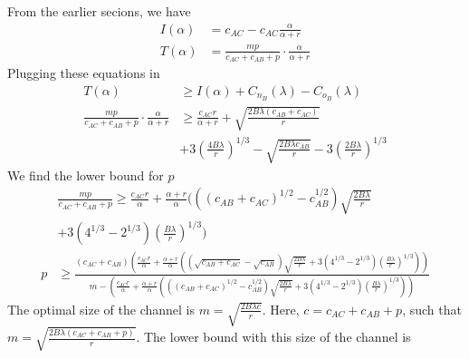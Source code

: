 \documentclass[12pt]{article}
\theoremstyle{plain}
\theoremstyle{remark}
\theoremstyle{definition}
\renewcommand{\geq}{\geqslant}
\renewcommand{\geq}{\geqslant}
\begin{document}
From the earlier secions, we have 
\begin{align}
  I(\alpha) &= c_{AC}-c_{AC}\frac{\alpha}{\alpha + r}\\
  T(\alpha) &= \frac{mp}{c_{AC}+c_{AB}+p} \cdot \frac{\alpha}{\alpha + r}
\end{align}
Plugging these equations in
\begin{align}
  T(\alpha) & \geq  I(\alpha) + C_{n_B}(\lambda) - C_{o_B}(\lambda)\\
  \frac{mp}{c_{AC}+c_{AB}+p} \cdot \frac{\alpha}{\alpha + r} & \geq \frac{c_{AC}r}{\alpha + r} + \sqrt{\frac{2B\lambda (c_{AB}+ c_{AC})}{r}}\\
  &  + 3(\frac{4B\lambda}{r})^{1/3} - \sqrt{\frac{2B\lambda c_{AB}}{r}}- 3(\frac{2B\lambda}{r})^{1/3}
\end{align}
We find the lower bound for $p$
\begin{align}
  &\frac{mp}{c_{AC}+c_{AB}+p} \geq \frac{c_{AC}r}{\alpha} + \frac{\alpha + r}{\alpha}(((c_{AB}+ c_{AC})^{1/2}-c_{AB}^{1/2})\sqrt{\frac{2B\lambda }{r}}\\
  &  + 3(4^{1/3}-2^{1/3})(\frac{B\lambda}{r})^{1/3})\\
  p & \geq \frac{(c_{AC}+c_{AB})(\frac{c_{AC}r}{\alpha} + \frac{\alpha + r}{\alpha}((\sqrt{c_{AB}+ c_{AC}}-\sqrt{c_{AB}})\sqrt{\frac{2B\lambda }{r}} + 3(4^{1/3}-2^{1/3})(\frac{B\lambda}{r})^{1/3}))}{m-(\frac{c_{AC}r}{\alpha} + \frac{\alpha + r}{\alpha}(((c_{AB}+ c_{AC})^{1/2}-c_{AB}^{1/2})\sqrt{\frac{2B\lambda }{r}} + 3(4^{1/3}-2^{1/3})(\frac{B\lambda}{r})^{1/3}))}
\end{align}
The optimal size of the channel is $m=\sqrt{\frac{2B\lambda c}{r}}$. Here, $c=c_{AC}+c_{AB}+p$, such that $m=\sqrt{\frac{2B\lambda (c_{AC}+c_{AB}+p)}{r}}$. The lower bound with this size of the channel is 
\end{document}
